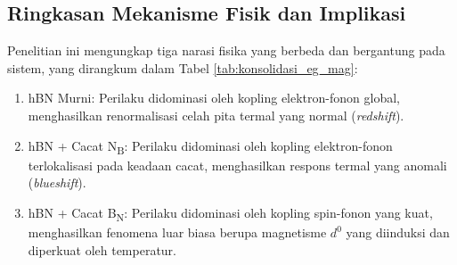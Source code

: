 \subsection{Ringkasan Mekanisme Fisik dan Implikasi}
\label{subsec:ringkasan_implikasi}
Penelitian ini mengungkap tiga narasi fisika yang berbeda dan bergantung pada sistem, yang dirangkum dalam Tabel \ref{tab:konsolidasi_eg_mag}:
\begin{enumerate}
    \item hBN Murni: Perilaku didominasi oleh kopling elektron-fonon global, menghasilkan renormalisasi celah pita termal yang normal (\emph{redshift}).
\item hBN + Cacat N\textsubscript{B}: Perilaku didominasi oleh kopling elektron-fonon terlokalisasi pada keadaan cacat, menghasilkan respons termal yang anomali (\emph{blueshift}).
\item hBN + Cacat B\textsubscript{N}: Perilaku didominasi oleh kopling spin-fonon yang kuat, menghasilkan fenomena luar biasa berupa magnetisme $d^0$ yang diinduksi dan diperkuat oleh temperatur.
\end{enumerate}

